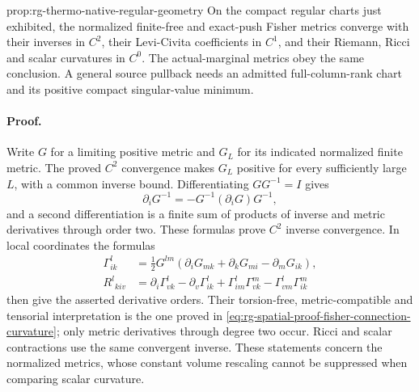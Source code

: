 {prop:rg-thermo-native-regular-geometry}
On the compact regular charts just exhibited, the normalized finite-free
and exact-push Fisher metrics converge with their inverses in \(C^2\),
their Levi-Civita coefficients in \(C^1\), and their Riemann, Ricci and
scalar curvatures in \(C^0\). The actual-marginal metrics obey the same
conclusion. A general source pullback needs an admitted full-column-rank
chart and its positive compact singular-value minimum.\thermoestablishedstatus


\paragraph{Proof.}
Write \(G\) for a limiting positive metric and \(G_L\) for its indicated
normalized finite metric. The proved \(C^2\) convergence makes
\(G_L\) positive for every sufficiently large \(L\), with a common
inverse bound. Differentiating \(GG^{-1}=I\) gives
\begin{equation}
 \partial_iG^{-1}=-G^{-1}(\partial_iG)G^{-1},
 \label{eq:rg-thermo-native-inverse-derivative}
\end{equation}
and a second differentiation is a finite sum of products of inverse and
metric derivatives through order two. These formulas prove \(C^2\)
inverse convergence. In local coordinates the formulas
\begin{equation}
 \begin{split}
 \Gamma^l_{ik}&=\frac12G^{lm}
  (\partial_iG_{mk}+\partial_kG_{mi}-\partial_mG_{ik}),\\
 R^l{}_{kiv}&=\partial_i\Gamma^l_{vk}-\partial_v\Gamma^l_{ik}
       +\Gamma^l_{im}\Gamma^m_{vk}-\Gamma^l_{vm}\Gamma^m_{ik}
 \end{split}
 \label{eq:rg-thermo-native-connection-curvature}
\end{equation}
then give the asserted derivative orders. Their torsion-free,
metric-compatible and tensorial interpretation is the one proved in
\cref{eq:rg-spatial-proof-fisher-connection-curvature}; only metric
derivatives through degree two occur. Ricci and scalar contractions use
the same convergent inverse. These statements concern the normalized
metrics, whose constant volume rescaling cannot be suppressed when
comparing scalar curvature.

